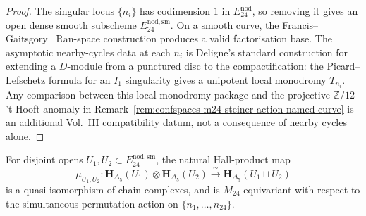\begin{proof}
The singular locus $\{n_i\}$ has codimension $1$ in $E^{\mathrm{nod}}_{24}$,
so removing it gives an open dense smooth subscheme
$E^{\mathrm{nod,sm}}_{24}$. On a smooth curve, the
Francis--Gaitsgory~\cite{FrancisGaitsgory2011} Ran-space construction
produces a valid factorisation base. The asymptotic nearby-cycles data
at each $n_i$ is Deligne's standard construction for extending a
$D$-module from a punctured disc to the compactification: the
Picard--Lefschetz formula for an $I_1$ singularity gives a unipotent
local monodromy $T_{n_i}$. Any comparison between this local monodromy
package and the projective $\mathbb Z/12$ 't Hooft anomaly in
Remark~\ref{rem:confspaces-m24-steiner-action-named-curve} is an
additional Vol.~III compatibility datum, not a consequence of nearby
cycles alone.
\end{proof}

\begin{theorem}
\label{thm:confspaces-factorisation-axiom-disjoint-opens}
\ClaimStatusConditional
For disjoint opens $U_1, U_2 \subset E^{\mathrm{nod,sm}}_{24}$, the
natural Hall-product map
\begin{equation}
\label{eq:confspaces-fact-axiom-disjoint}
 \mu_{U_1,U_2}\colon
 \mathbf{H}_{\Delta_5}(U_1)\otimes\mathbf{H}_{\Delta_5}(U_2)
 \xrightarrow{\ \sim\ }
 \mathbf{H}_{\Delta_5}(U_1\sqcup U_2)
\end{equation}
is a quasi-isomorphism of chain complexes, and is $M_{24}$-equivariant
with respect to the simultaneous permutation action on
$\{n_1,\ldots,n_{24}\}$.
\end{theorem}


